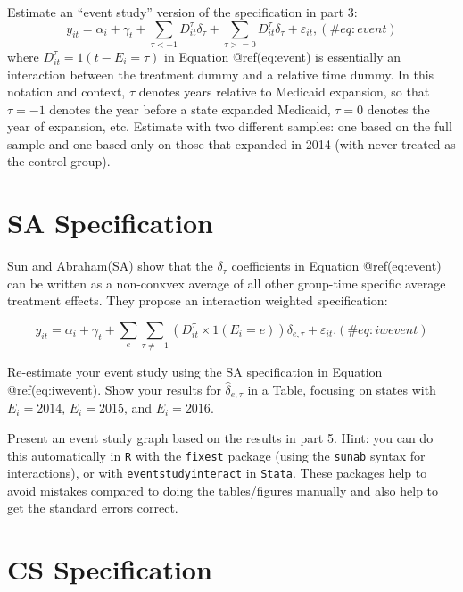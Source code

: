 \documentclass[
]{article}
\begin{document}
Estimate an ``event study'' version of the specification in part 3:
\begin{equation}
y_{it} = \alpha_{i} + \gamma_{t} +\sum_{\tau < -1} D_{it}^{\tau} \delta_{\tau} + \sum_{\tau>=0} D_{it}^{\tau} \delta_{\tau} + \varepsilon_{it},
(\#eq:event)
\end{equation} where \(D_{it}^{\tau} = 1(t-E_{i}=\tau)\) in Equation
@ref(eq:event) is essentially an interaction between the treatment dummy
and a relative time dummy. In this notation and context, \(\tau\)
denotes years relative to Medicaid expansion, so that \(\tau=-1\)
denotes the year before a state expanded Medicaid, \(\tau=0\) denotes
the year of expansion, etc. Estimate with two different samples: one
based on the full sample and one based only on those that expanded in
2014 (with never treated as the control group).

\hypertarget{sa-specification}{%
\section{SA Specification}\label{sa-specification}}

Sun and Abraham(SA) show that the \(\delta_{\tau}\) coefficients in
Equation @ref(eq:event) can be written as a non-conxvex average of all
other group-time specific average treatment effects. They propose an
interaction weighted specification:

\begin{equation}
y_{it} = \alpha_{i} + \gamma_{t} +\sum_{e} \sum_{\tau \neq -1} \left(D_{it}^{\tau} \times 1(E_{i}=e)\right) \delta_{e, \tau} + \varepsilon_{it}.
(\#eq:iwevent)
\end{equation}

Re-estimate your event study using the SA specification in Equation
@ref(eq:iwevent). Show your results for \(\hat{\delta}_{e, \tau}\) in a
Table, focusing on states with \(E_{i}=2014\), \(E_{i}=2015\), and
\(E_{i}=2016\).

Present an event study graph based on the results in part 5. Hint: you
can do this automatically in \texttt{R} with the \texttt{fixest} package
(using the \texttt{sunab} syntax for interactions), or with
\texttt{eventstudyinteract} in \texttt{Stata}. These packages help to
avoid mistakes compared to doing the tables/figures manually and also
help to get the standard errors correct.

\hypertarget{cs-specification}{%
\section{CS Specification}\label{cs-specification}}
\end{document}

